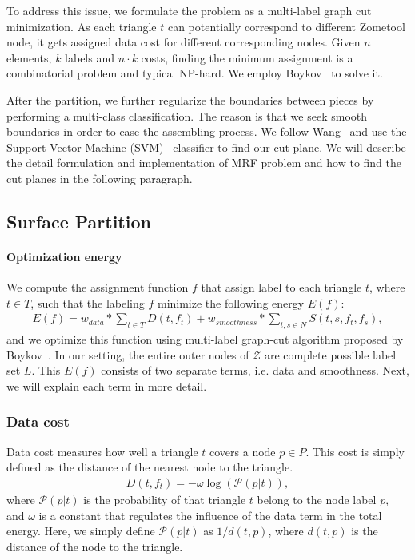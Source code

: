 To address this issue, we formulate the problem as a multi-label graph cut minimization.
As each triangle $t$ can potentially correspond to different Zometool node, it gets assigned data cost for different corresponding nodes.
Given $n$ elements, $k$ labels and $n\cdot k$ costs, finding the minimum assignment is a combinatorial problem and typical NP-hard.
We employ Boykov~\cite{boykov:2004:experimental} to solve it.

After the partition, we further regularize the boundaries between pieces by performing a multi-class classification.
The  reason is that we seek smooth boundaries in order to ease the assembling process.
We follow Wang~\cite{wang2016improved} and use the Support Vector Machine (SVM)~\cite{cortes1995support} classifier to find our cut-plane. 
We will describe the detail formulation and implementation of MRF problem and how to find the cut planes in the following paragraph.

\subsection{Surface Partition}
\paragraph{Optimization energy}
We compute the assignment function $f$ that assign label to each triangle $t$, where $t \in T$, such that the labeling $f$ minimize the following energy $E(f)$:
\begin{align} \label{eq:graph}
E(f) = w_{data} * \sum_{t\in T}D(t, f_t) + w_{smoothness} * \sum_{t,s\in N} S(t, s, f_t, f_s),
\end{align}
and we optimize this function using multi-label graph-cut algorithm proposed by Boykov~\cite{boykov:2004:experimental}.
In our setting, the entire outer nodes of $\mathcal{Z}$ are complete possible label set $L$.
This $E(f)$ consists of two separate terms, i.e.\chinky{,} data and smoothness.
Next, we will explain each term in more detail.

\subsubsection{Data cost}
Data cost measures how well a triangle $t$ covers a node $p \in P$.
This cost is simply defined as the distance of the nearest node to the triangle.
\begin{align}
D(t, f_t) = -\omega \log(\mathcal{P}(p | t)),
\end{align}
where $\mathcal{P}(p | t)$ is the probability of that triangle $t$ belong to the node label $p$, and $\omega$ is a constant that
regulates the influence of the data term in the total energy.
Here, we simply define $\mathcal{P}(p | t)$ as $1/d(t,p)$, where $d(t,p)$ is the distance of the node to the triangle.
